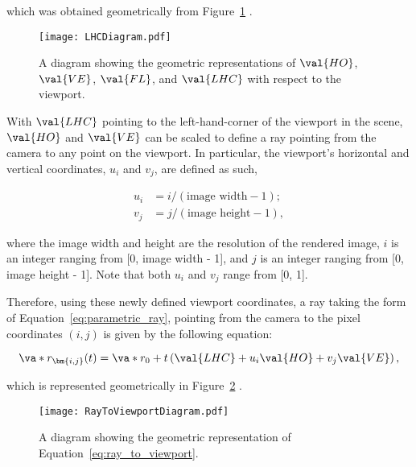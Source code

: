 \noindent which was obtained geometrically from Figure~\ref{fig:LHC_diagram} \cite{Shirley}.

\begin{figure}[H]
    \centering
	\texttt{[image: LHCDiagram.pdf]}
	\caption{A diagram showing the geometric representations of $\protect\val{HO}$, $\protect\val{VE}$,
   $\protect\val{FL}$, and $\protect\val{LHC}$ with respect to the viewport.}
	\label{fig:LHC_diagram}
\end{figure}

\par With $\val{LHC}$ pointing to the left-hand-corner of the viewport in the scene, $\val{HO}$ and $\val{VE}$ can be scaled to define a ray pointing from the camera to any point on the viewport. In particular,  the viewport's horizontal and vertical coordinates, $u_i$ and $v_j$, are defined as such,

\begin{align}
u_i &= i/(\text{image width} - 1);\\
v_j &= j/(\text{image height} - 1),
\label{eq:viewport_coords}
\end{align}

\noindent where the image width and height are the resolution of the rendered image, $i$ is an integer ranging from [0, image width - 1], and $j$ is an integer ranging from [0, image height - 1]. Note that both $u_i$ and $v_j$ range from [0, 1].

\par Therefore, using these newly defined viewport coordinates, a ray taking the form of Equation~\ref{eq:parametric_ray}, pointing from the camera to the pixel coordinates $(i, j)$ is given by the following equation:

\begin{equation}
  \va*{r}_{\bm{i,j}}(t) = \va*{r_0} + t \left( \val{LHC} + u_i \val{HO}  + v_j \val{VE} \right),
  \label{eq:ray_to_viewport}
\end{equation}

\noindent which is represented geometrically in Figure~\ref{fig:ray_to_viewport_diagram} \cite{Shirley}.

\begin{figure}[H]
  \centering
\texttt{[image: RayToViewportDiagram.pdf]}
\caption{A diagram showing the geometric representation of Equation~\ref{eq:ray_to_viewport}.}
\label{fig:ray_to_viewport_diagram}
\end{figure}

